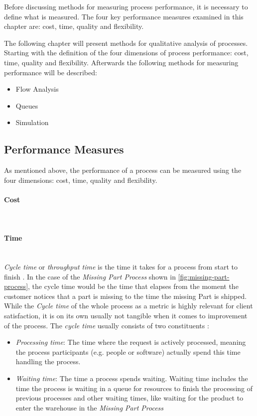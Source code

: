 Before discussing methods for measuring process performance, it is necessary to define what is measured. The four key performance measures examined in this chapter are: cost, time, quality and flexibility. \cite{fundamentals}

The following chapter will present methods for qualitative analysis of processes. Starting with the definition of the four dimensions of process performance: cost, time, quality and flexibility. Afterwards the following methods for measuring performance will be described: 

\begin{itemize}
	\item Flow Analysis
	\item Queues
	\item Simulation
\end{itemize}
\subsection{Performance Measures}
As mentioned above, the performance of a process can be measured using the four dimensions:  cost, time, quality and flexibility. 
\paragraph{Cost}~\\

\paragraph{Time}~\\
\textit{Cycle time} or \textit{throughput time} is the time it takes for a process from start to finish \cite{Six-sigma-terms}. In the case of the \textit{Missing Part Process} shown in \ref{fig:missing-part-process}, the cycle time would be the time that elapses from the moment the customer notices that a part is missing to the time the missing Part is shipped. While the \textit{Cycle time} of the whole process as a metric is highly relevant for client satisfaction, it is on its own usually not tangible when it comes to improvement of the process. The \textit{cycle time} usually consists of two constituents \cite{fundamentals}:
\begin{itemize}
	\item \textit{Processing time}: The time where the request is actively processed, meaning the process participants (e.g. people or software) actually spend this time handling the process. 
	\item \textit{Waiting time}: The time a process spends waiting. Waiting time includes the time the process is waiting in a queue for resources to finish the processing of previous processes and other waiting times, like waiting for the product to enter the warehouse in the \textit{Missing Part Process}
\end{itemize}
